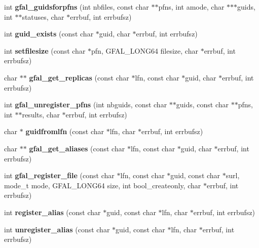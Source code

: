 \begin{CompactItemize}
\item 
int \textbf{gfal\_\-guidsforpfns} (int nbfiles, const char $\ast$$\ast$pfns, int amode, char $\ast$$\ast$$\ast$guids, int $\ast$$\ast$statuses, char $\ast$errbuf, int errbufsz)\label{group__internal__group_g72f2d9fb6a55816f243a4c57c5369fe5}

\item 
int \textbf{guid\_\-exists} (const char $\ast$guid, char $\ast$errbuf, int errbufsz)\label{gfal__common_8c_a880588c2bf383146384431128d4cf88}

\item 
int \textbf{setfilesize} (const char $\ast$pfn, GFAL\_\-LONG64 filesize, char $\ast$errbuf, int errbufsz)\label{gfal__common_8c_ba9082c3f661f0aa6a1f4398031a5b52}

\item 
char $\ast$$\ast$ \textbf{gfal\_\-get\_\-replicas} (const char $\ast$lfn, const char $\ast$guid, char $\ast$errbuf, int errbufsz)\label{group__internal__group_gbd0a581309f65e07a5e28d442f07b169}

\item 
int \textbf{gfal\_\-unregister\_\-pfns} (int nbguids, const char $\ast$$\ast$guids, const char $\ast$$\ast$pfns, int $\ast$$\ast$results, char $\ast$errbuf, int errbufsz)\label{group__internal__group_g70f889fa2436723fb7b3cff20b661f21}

\item 
char $\ast$ \textbf{guidfromlfn} (const char $\ast$lfn, char $\ast$errbuf, int errbufsz)\label{gfal__common_8c_fffd314fbaeab0aff9beb7c5b47ab13d}

\item 
char $\ast$$\ast$ \textbf{gfal\_\-get\_\-aliases} (const char $\ast$lfn, const char $\ast$guid, char $\ast$errbuf, int errbufsz)\label{group__internal__group_g25d4ae6bef6570590efbc8548e7d79e2}

\item 
int \textbf{gfal\_\-register\_\-file} (const char $\ast$lfn, const char $\ast$guid, const char $\ast$surl, mode\_\-t mode, GFAL\_\-LONG64 size, int bool\_\-createonly, char $\ast$errbuf, int errbufsz)\label{group__internal__group_gdb09f20d086253b45c5d2896be95b4a9}

\item 
int \textbf{register\_\-alias} (const char $\ast$guid, const char $\ast$lfn, char $\ast$errbuf, int errbufsz)\label{gfal__common_8c_4bb13064562b552627698601dda010cd}

\item 
int \textbf{unregister\_\-alias} (const char $\ast$guid, const char $\ast$lfn, char $\ast$errbuf, int errbufsz)\label{gfal__common_8c_8877542e026eef3292c7f5ab44c55124}


\end{CompactItemize}
